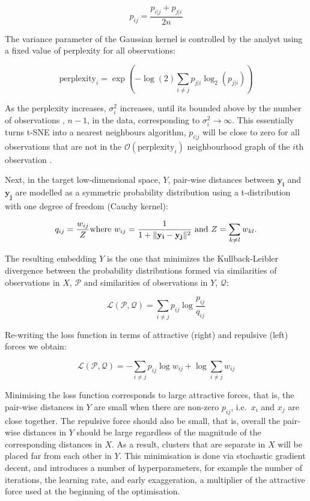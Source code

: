\documentclass[article,notitle]{jdssv}
\begin{document}
\[ p_{ij} = \frac{p_{i|j} + p_{j|i}}{2n} \]

The variance parameter of the Gaussian kernel is controlled by the analyst
using a fixed value of perplexity for all observations:

\[ \text{perplexity}_i = \exp(-\log(2) \sum_{i \ne j}p_{j|i}\log_2(p_{j|i})) \]

As the perplexity increases, \(\sigma^2_{i}\) increases, until its bounded above
by the number of observations , \(n-1\), in the data, corresponding to
\(\sigma^2_{i} \rightarrow \infty\). This essentially turns t-SNE into a
nearest neighbours algorithm, \(p_{i|j}\) will be close to zero for all
observations that are not in the \(\mathcal{O}(\text{perplexity}_i)\)
neighbourhood graph of the \(i\)th observation \citep{Van_Der_Maaten2014-zn}.

Next, in the target low-dimensional space, \(Y\), pair-wise distances between
\(\mathbf{y_i}\) and \(\mathbf{y_j}\) are modelled as a symmetric probability
distribution using a t-distribution with one degree of freedom (Cauchy kernel):

\[ q_{ij} = \frac{w_{ij}}{Z} \\ \text{where } w_{ij} = \frac{1}{ 1 + \lVert
\mathbf{y_i - y_j} \rVert ^ 2} \text{ and } Z = \sum_{k \ne l} w_{kl}. \]

The resulting embedding \(Y\) is the one that minimizes the Kullback-Leibler
divergence between the probability distributions formed via similarities of
observations in \(X\), \(\mathcal{P}\) and similarities of observations in \(Y\),
\(\mathcal{Q}\):

\[ \mathcal{L(\mathcal{P}, \mathcal{Q})} = \sum_{i \ne j} p_{ij} \log
\frac{p_{ij}}{q_{ij}}\]

Re-writing the loss function in terms of attractive (right) and repulsive
(left) forces we obtain:

\[ \mathcal{L(\mathcal{P}, \mathcal{Q})} = -\sum_{i \ne j} p_{ij}\log w_{ij} +
\log\sum_{i \ne j} w_{ij} \]

Minimising the loss function corresponds to large attractive
forces, that is, the pair-wise distances in \(Y\) are small when there are
non-zero \(p_{ij}\), i.e.~\(x_i\) and \(x_j\) are close together. The repulsive force
should also be small, that is, overall the
pair-wise distances in \(Y\) should be large regardless of the magnitude of the
corresponding distances in \(X\). As a result, clusters that are separate in \(X\)
will be placed far from each other in \(Y\).
This minimisation is done via stochastic gradient decent,
and introduces a number of hyperparameters, for example the number of iterations,
the learning rate, and early exaggeration, a multiplier of the attractive force
used at the beginning of the optimisation.
\end{document}
